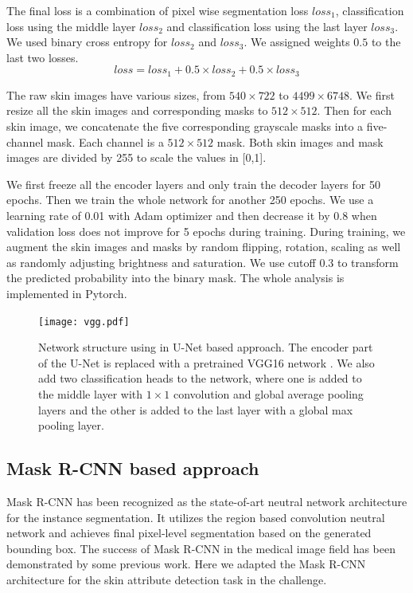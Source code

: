 \documentclass{article}
\begin{document}
The final loss is a combination of pixel wise segmentation loss $loss_1$, classification loss using the middle layer $loss_2$ and classification loss using the last layer $loss_3$. We used binary cross entropy for $loss_2$ and $loss_3$. We assigned weights $0.5$ to the last two losses.  
\begin{equation}
loss=loss_1+0.5\times loss_2 + 0.5\times loss_3
\end{equation}

The raw skin images have various sizes, from $540\times722$ to $4499\times6748$. We first resize all the skin images and corresponding masks to $512\times512$. Then for each skin image, we concatenate the five corresponding grayscale masks into a five-channel mask. Each channel is a $512\times512$ mask.  Both skin images and mask images are divided by 255 to scale the values in [0,1].

We first freeze all the encoder layers and only train the decoder layers for 50 epochs. Then we train the whole network for another 250 epochs. We use a learning rate of 0.01 with Adam optimizer and then decrease it by 0.8 when validation loss does not improve for 5 epochs during training. During training, we augment the skin images and masks by random flipping, rotation, scaling as well as randomly adjusting brightness and saturation. We use cutoff 0.3 to transform the predicted probability into the binary mask. The whole analysis is implemented in Pytorch. 

\begin{figure}
\centering
\label{fig1}
\texttt{[image: vgg.pdf]}
\caption{Network structure using in U-Net based approach. The encoder part of the U-Net is replaced with a pretrained VGG16 network \citep{shvets2018automatic}. We also add two classification heads to the network, where one is added to the middle layer with $1\times1$ convolution and global average pooling layers and the other is added to the last layer with a global max pooling layer.}
\end{figure}

\subsection{Mask R-CNN based approach}
Mask R-CNN has been recognized as the state-of-art neutral network architecture for the instance segmentation. It utilizes the region based convolution neutral network and achieves final pixel-level segmentation based on the generated bounding box. The success of Mask R-CNN in the medical image field has been demonstrated by some previous work. Here we adapted the Mask R-CNN architecture for the skin attribute detection task in the challenge.
\end{document}
